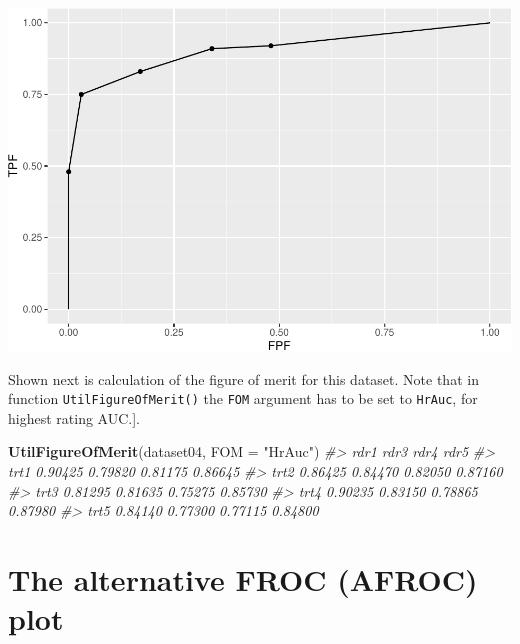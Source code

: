 \documentclass[
]{book}
\newenvironment{Shaded}{\begin{snugshade}}{\end{snugshade}}
\newcommand{\CommentTok}[1]{\textcolor[rgb]{0.56,0.35,0.01}{\textit{#1}}}
\newcommand{\DataTypeTok}[1]{\textcolor[rgb]{0.13,0.29,0.53}{#1}}
\newcommand{\DecValTok}[1]{\textcolor[rgb]{0.00,0.00,0.81}{#1}}
\newcommand{\KeywordTok}[1]{\textcolor[rgb]{0.13,0.29,0.53}{\textbf{#1}}}
\newcommand{\NormalTok}[1]{#1}
\newcommand{\OperatorTok}[1]{\textcolor[rgb]{0.81,0.36,0.00}{\textbf{#1}}}
\newcommand{\StringTok}[1]{\textcolor[rgb]{0.31,0.60,0.02}{#1}}
\begin{document}
\begin{Shaded}
\end{Shaded}

\includegraphics{03-empirical_files/figure-latex/unnamed-chunk-4-1.pdf}

Shown next is calculation of the figure of merit for this dataset. Note that in function \texttt{UtilFigureOfMerit()} the \texttt{FOM} argument has to be set to \texttt{HrAuc}, for highest rating AUC.{]}.

\begin{Shaded}
\begin{Highlighting}[]
\KeywordTok{UtilFigureOfMerit}\NormalTok{(dataset04, }\DataTypeTok{FOM =} \StringTok{"HrAuc"}\NormalTok{)}
\CommentTok{#>         rdr1    rdr3    rdr4    rdr5}
\CommentTok{#> trt1 0.90425 0.79820 0.81175 0.86645}
\CommentTok{#> trt2 0.86425 0.84470 0.82050 0.87160}
\CommentTok{#> trt3 0.81295 0.81635 0.75275 0.85730}
\CommentTok{#> trt4 0.90235 0.83150 0.78865 0.87980}
\CommentTok{#> trt5 0.84140 0.77300 0.77115 0.84800}
\end{Highlighting}
\end{Shaded}

\hypertarget{empirical-AFROC}{%
\section{The alternative FROC (AFROC) plot}\label{empirical-AFROC}}
\end{document}
